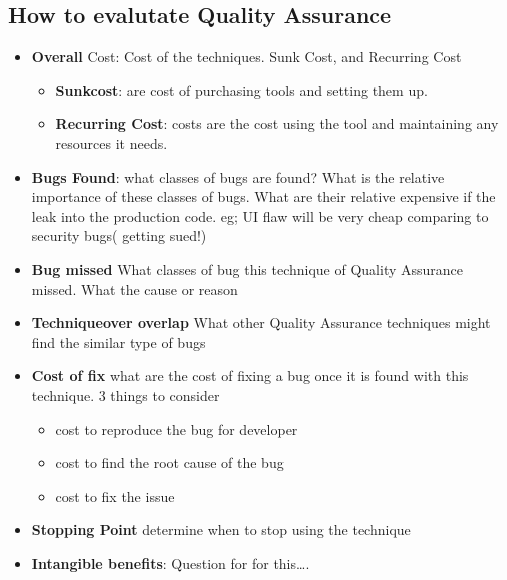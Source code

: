 \documentclass{article}
\begin{document}
 \subsection{ How to evalutate Quality Assurance}
 \begin{itemize}
   \item \textbf{Overall} Cost: Cost of the techniques. Sunk Cost, and Recurring
   Cost
   \begin{itemize}
     \item \textbf{Sunkcost}: are cost of purchasing tools and setting them up.
     \item \textbf{Recurring Cost}: costs are the cost using the tool and
     maintaining any resources it needs.
   \end{itemize}
   \item \textbf{Bugs Found}: what classes of bugs are found? What is the
   relative importance of these classes of bugs. What are their relative
   expensive if the leak into the production code. eg; UI flaw will be very
   cheap comparing to security bugs( getting sued!)
   \item \textbf{Bug missed} What classes of bug this technique of Quality
   Assurance missed. What the cause or reason 
   \item \textbf{Techniqueover overlap} What other Quality Assurance techniques
   might find the similar type of bugs
   \item \textbf{ Cost of fix} what are the cost of fixing a bug once it is
   found with this technique. 3 things to consider
   \begin{itemize}
     \item cost to reproduce the bug for developer
     \item cost to find the root cause of the bug
     \item cost to fix the issue
   \end{itemize}
   \item \textbf{Stopping Point} determine when to stop using the technique
   \item \textbf{Intangible benefits}: Question for for this\ldots.
 \end{itemize}
 
\end{document}
